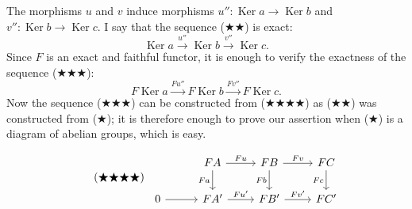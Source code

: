 The morphisms $u$ and $v$ induce morphisms
$u''\colon \operatorname{Ker}a \to \operatorname{Ker}b$ and
$v''\colon \operatorname{Ker}b \to \operatorname{Ker}c$. I say that the
sequence ($\bigstar\bigstar$) is exact:
\[
\tag{$\bigstar\bigstar$}
  \operatorname{Ker}a \xrightarrow{u''} \operatorname{Ker}b
  \xrightarrow{v''} \operatorname{Ker}c .
\]
Since $F$ is an exact and faithful functor, it is enough to verify the
exactness of the sequence ($\bigstar\bigstar\bigstar$):
\[
\tag{$\bigstar\bigstar\bigstar$}
  F\operatorname{Ker}a \xrightarrow{Fu''} F\operatorname{Ker}b
  \xrightarrow{Fv''} F\operatorname{Ker}c .
\]
Now the sequence ($\bigstar\bigstar\bigstar$) can be constructed from
($\bigstar\bigstar\bigstar\bigstar$) as ($\bigstar\bigstar$) was constructed
from ($\bigstar$); it is therefore enough to prove our assertion when
($\bigstar$) is a diagram of abelian groups, which is easy.

\[
\tag{$\bigstar\bigstar\bigstar\bigstar$}
\begin{tikzcd}
\phantom{FA}
  & FA \arrow[r, "Fu"] \arrow[d, "Fa"']
  & FB \arrow[r, "Fv"] \arrow[d, "Fb"']
  & FC \arrow[d, "Fc"'] \\
0 \arrow[r]
  & FA' \arrow[r, "Fu'"]
  & FB' \arrow[r, "Fv'"]
  & FC'
\end{tikzcd}
\]